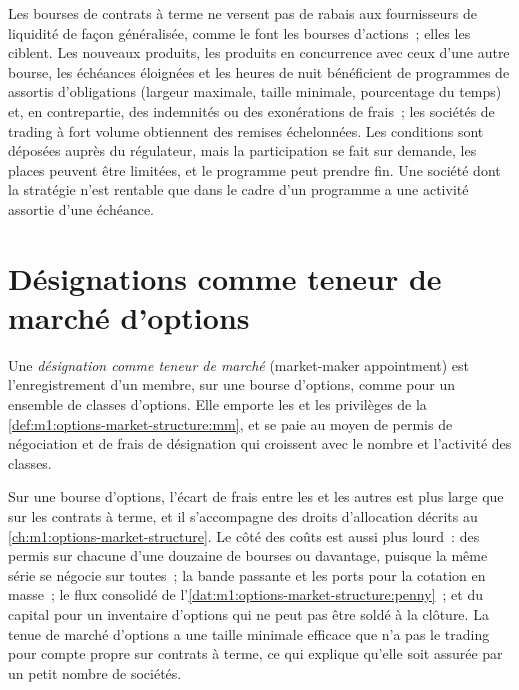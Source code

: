 Les bourses de contrats à terme ne versent pas de rabais aux fournisseurs de liquidité de façon généralisée, comme le font les bourses d'actions~;
elles les ciblent. Les nouveaux produits, les produits en concurrence avec ceux
d'une autre bourse, les échéances éloignées et les heures de nuit bénéficient de programmes de 
assortis d'obligations (largeur maximale, taille minimale, pourcentage
du temps) et, en contrepartie, des indemnités ou des exonérations de frais~; les sociétés de trading
à fort volume obtiennent des remises échelonnées. Les conditions sont déposées auprès du régulateur, mais
la participation se fait sur demande, les places peuvent être limitées, et le programme
peut prendre fin. Une société dont la stratégie n'est rentable que dans le cadre d'un programme a
une activité assortie d'une échéance.

\section{Désignations comme teneur de marché d'options}

\begin{definition}\label{def:m1:getting-access-futures-options:appointment}
Une \emph{désignation comme teneur de marché} (market-maker appointment) est
l'enregistrement d'un membre, sur une bourse d'options, comme  pour un ensemble de
classes d'options. Elle emporte les  et les privilèges de la
\cref{def:m1:options-market-structure:mm}, et se paie au moyen de permis de négociation et de
frais de désignation qui croissent avec le nombre et l'activité
des classes.
\end{definition}

Sur une bourse d'options, l'écart de frais entre les  et les autres
est plus large que sur les contrats à terme, et il s'accompagne des droits d'allocation décrits au
\cref{ch:m1:options-market-structure}. Le côté des coûts est aussi plus lourd~: des permis
sur chacune d'une douzaine de bourses ou davantage, puisque la même série se négocie sur toutes~;
la bande passante et les ports pour la cotation en masse~; le flux consolidé de
l'\cref{dat:m1:options-market-structure:penny}~; et du capital pour un inventaire d'options
qui ne peut pas être soldé à la clôture. La tenue de marché d'options a une taille minimale efficace
que n'a pas le trading pour compte propre sur contrats à terme, ce qui explique
qu'elle soit assurée par un petit nombre de sociétés.

